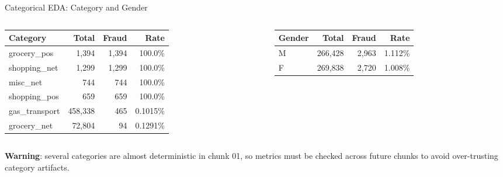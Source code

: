 \documentclass{beamer}
\begin{document}
\begin{frame}{Categorical EDA: Category and Gender}
    \begin{columns}[onlytextwidth, c]
        \begin{column}{0.58\textwidth}
            \begin{table}
                \centering
                \tiny
                \begin{tabular}{lrrr}
                    \toprule
                    \textbf{Category} & \textbf{Total} & \textbf{Fraud} & \textbf{Rate} \\
                    \midrule
                    grocery\_pos & 1,394 & 1,394 & 100.0\% \\
                    shopping\_net & 1,299 & 1,299 & 100.0\% \\
                    misc\_net & 744 & 744 & 100.0\% \\
                    shopping\_pos & 659 & 659 & 100.0\% \\
                    gas\_transport & 458,338 & 465 & 0.1015\% \\
                    grocery\_net & 72,804 & 94 & 0.1291\% \\
                    \bottomrule
                \end{tabular}
            \end{table}
        \end{column}
        \begin{column}{0.4\textwidth}
            \begin{table}
                \centering
                \scriptsize
                \begin{tabular}{lrrr}
                    \toprule
                    \textbf{Gender} & \textbf{Total} & \textbf{Fraud} & \textbf{Rate} \\
                    \midrule
                    M & 266,428 & 2,963 & 1.112\% \\
                    F & 269,838 & 2,720 & 1.008\% \\
                    \bottomrule
                \end{tabular}
            \end{table}
        \end{column}
    \end{columns}

    \vspace{0.2cm}
    \small
    \textbf{Warning}: several categories are almost deterministic in chunk 01, so metrics must be checked across future chunks to avoid over-trusting category artifacts.
\end{frame}
\end{document}
